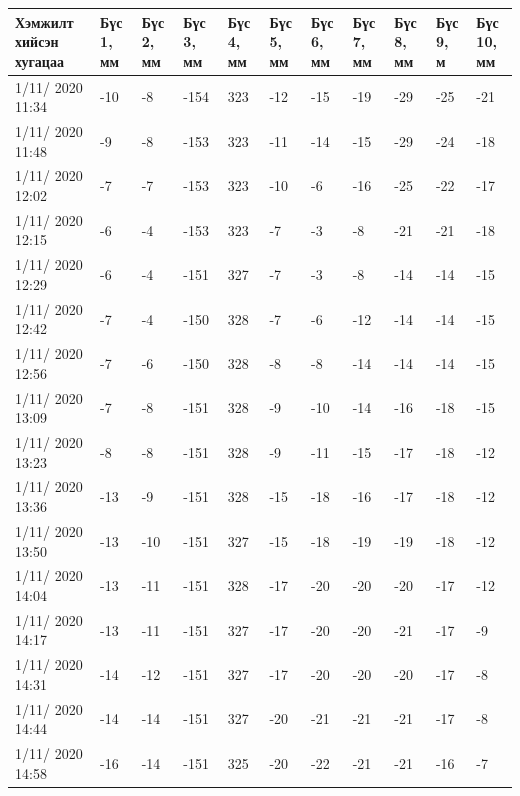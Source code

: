 \begin{table}[h]
    \centering
    \begin{tabular}{|p{1.5cm}|p{0.8cm}|p{0.8cm}|p{0.8cm}|p{0.8cm}|p{0.8cm}|p{0.8cm}|p{0.8cm}|p{0.8cm}|p{0.8cm}|p{0.8cm}|}
         \hline
     Хэмжилт хийсэн хугацаа & Бүс 1, мм&	Бүс 2, мм&	Бүс 3, мм&	Бүс 4, мм&	Бүс 5, мм&	Бүс 6, мм&	Бүс 7, мм&	Бүс 8, мм&	Бүс 9, м&	Бүс 10, мм \\ \hline
1/11/ 2020 11:34&	-10&-8&	-154&	323&-12&-15&	-19&-29&-25&	-21\\ \hline
1/11/ 2020 11:48&	-9&	-8&	-153&	323&-11&-14&	-15&-29&-24&	-18\\ \hline
1/11/ 2020 12:02&	-7&	-7&	-153&	323&-10&-6&	    -16&-25&-22&	-17\\ \hline
1/11/ 2020 12:15&	-6&	-4&	-153&	323&-7&	-3&	    -8&	-21&-21&	-18\\ \hline
1/11/ 2020 12:29&	-6&	-4&	-151&	327&-7&	-3&	    -8&	-14&-14&	-15\\ \hline
1/11/ 2020 12:42&	-7&	-4&	-150&	328&-7&	-6&	    -12&-14&-14&	-15\\ \hline
1/11/ 2020 12:56&	-7&	-6&	-150&	328&-8&	-8&	    -14&-14&-14&	-15\\ \hline
1/11/ 2020 13:09&	-7&	-8&	-151&	328&-9&	-10&	-14&-16&-18&	-15\\ \hline
1/11/ 2020 13:23&	-8&	-8&	-151&	328&-9&	-11&	-15&-17&-18&	-12\\ \hline
1/11/ 2020 13:36&	-13&-9&	-151&	328&-15&-18&	-16&-17&-18&	-12\\ \hline
1/11/ 2020 13:50&	-13&-10&-151&	327&-15&-18&	-19&-19&-18&	-12\\ \hline
1/11/ 2020 14:04&	-13&-11&-151&	328&-17&-20&	-20&-20&-17&	-12\\ \hline
1/11/ 2020 14:17&	-13&-11&-151&	327&-17&-20&	-20&-21&-17&	-9\\ \hline
1/11/ 2020 14:31&	-14&-12&-151&	327&-17&-20&	-20&-20&-17&	-8\\ \hline
1/11/ 2020 14:44&	-14&-14&-151&	327&-20&-21&	-21&-21&-17&	-8\\ \hline
1/11/ 2020 14:58&	-16&-14&-151&	325&-20&-22&	-21&-21&-16&	-7\\ \hline
    \end{tabular}
\end{table}
